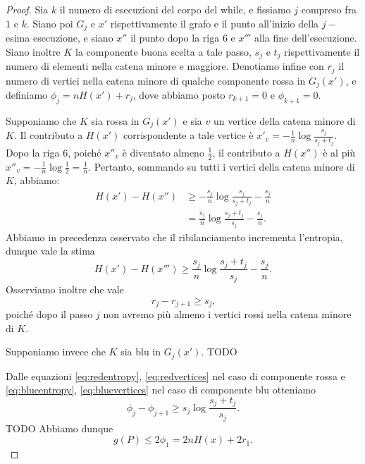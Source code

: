 \begin{proof}
	Sia \(k\) il numero di esecuzioni del corpo del while, e fissiamo \(j\) compreso fra \(1\) e \(k\). Siano poi \(G_j\) e \(x'\) rispettivamente il grafo e il punto all'inizio della \(j-\)esima esecuzione, e siano \(x''\) il punto dopo la riga \(6\) e \(x'''\) alla fine dell'esecuzione. Siano inoltre \(K\) la componente buona scelta a tale passo, \(s_j\) e \(t_j\) rispettivamente il numero di elementi nella catena minore e maggiore. Denotiamo infine con \(r_j\) il numero di vertici nella catena minore di qualche componente rossa in \(G_j(x')\), e definiamo \(\phi_j=nH(x')+r_j\), dove abbiamo posto \(r_{k+1}=0\) e \(\phi_{k+1}=0\).
	
	Supponiamo che \(K\) sia rossa in \(G_j(x')\) e sia \(v\) un vertice della catena minore di \(K\). Il contributo a \(H(x')\) corrispondente a tale vertice \`e \(x'_v = -\frac{1}{n}\log{\frac{s_j}{s_j+t_j}}\). Dopo la riga \(6\), poich\'e \(x''_v\) \`e diventato almeno \(\frac{1}{2}\), il contributo a \(H(x'')\) \`e al pi\`u \(x''_v = -\frac{1}{n}\log{\frac{1}{2}} = \frac{1}{n}\). Pertanto, sommando su tutti i vertici della catena minore di \(K\), abbiamo:
	\begin{align}
	  H(x')-H(x'') &\ge -\frac{s_j}{n}\log{\frac{s_j}{s_j+t_j}} - \frac{s_j}{n} \nonumber \\
	               &=   \frac{s_j}{n}\log{\frac{s_j+t_j}{s_j}} - \frac{s_j}{n}\text{.} \nonumber
	\end{align}
	Abbiamo in precedenza osservato che il ribilanciamento incrementa l'entropia, dunque vale la stima
	\begin{equation} \label{eq:redentropy}
	  H(x')-H(x''') \ge \frac{s_j}{n}\log{\frac{s_j+t_j}{s_j}} - \frac{s_j}{n}\text{.}
	\end{equation}
	Osserviamo inoltre che vale
	\begin{equation} \label{eq:redvertices}
	  r_j-r_{j+1} \ge s_j\text{,} 
	\end{equation}
	poich\'e dopo il passo \(j\) non avremo pi\`u almeno i vertici rossi nella catena minore di \(K\).
	
	Supponiamo invece che \(K\) sia blu in \(G_j(x')\). TODO
	\begin{equation} \label{eq:blueentropy}
	\end{equation}
	\begin{equation} \label{eq:bluevertices}
	\end{equation}
	
	Dalle equazioni \eqref{eq:redentropy}, \eqref{eq:redvertices} nel caso di componente rossa e \eqref{eq:blueentropy}, \eqref{eq:bluevertices} nel caso di componente blu otteniamo
	\[
	  \phi_j - \phi_{j+1} \ge s_j\log{\frac{s_j+t_j}{s_j}}\text{.}
	\]
	TODO
	Abbiamo dunque
	\begin{equation}
	  g(P) \le 2\phi_1 = 2nH(x) + 2r_1\text{.}
	\end{equation}
	

\end{proof}
